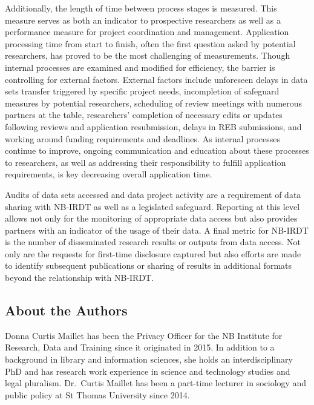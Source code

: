 \documentclass[
]{WileySix}
\begin{document}
Additionally, the length of time between process stages is measured. This measure serves as both an indicator to prospective researchers as well as a performance measure for project coordination and management. Application processing time from start to finish, often the first question asked by potential researchers, has proved to be the most challenging of measurements. Though internal processes are examined and modified for efficiency, the barrier is controlling for external factors. External factors include unforeseen delays in data sets transfer triggered by specific project needs, incompletion of safeguard measures by potential researchers, scheduling of review meetings with numerous partners at the table, researchers' completion of necessary edits or updates following reviews and application resubmission, delays in REB submissions, and working around funding requirements and deadlines. As internal processes continue to improve, ongoing communication and education about these processes to researchers, as well as addressing their responsibility to fulfill application requirements, is key decreasing overall application time.

Audits of data sets accessed and data project activity are a requirement of data sharing with NB-IRDT as well as a legislated safeguard. Reporting at this level allows not only for the monitoring of appropriate data access but also provides partners with an indicator of the usage of their data. A final metric for NB-IRDT is the number of disseminated research results or outputs from data access. Not only are the requests for first-time disclosure captured but also efforts are made to identify subsequent publications or sharing of results in additional formats beyond the relationship with NB-IRDT.

\hypertarget{about-the-authors-2}{%
\subsection*{About the Authors}\label{about-the-authors-2}}

Donna Curtis Maillet has been the Privacy Officer for the NB Institute for Research, Data and Training since it originated in 2015. In addition to a background in library and information sciences, she holds an interdisciplinary PhD and has research work experience in science and technology studies and legal pluralism. Dr.~Curtis Maillet has been a part-time lecturer in sociology and public policy at St Thomas University since 2014.
\end{document}

